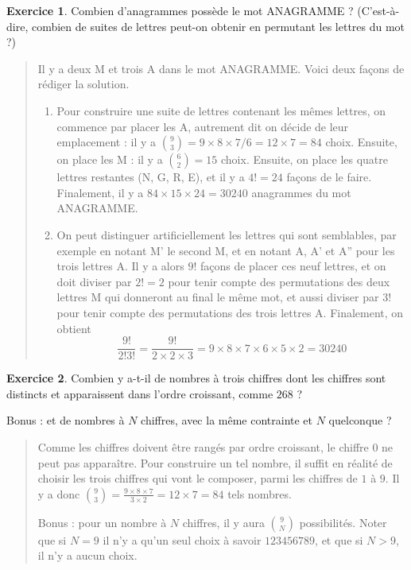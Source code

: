 \documentclass[11pt]{article}
\theoremstyle{definition}
\newtheorem{exo}{Exercice}
\newenvironment{solution}{\begin{quote}\color{teal}}{\end{quote}}
\begin{document}
\begin{exo}
Combien d'anagrammes possède le mot ANAGRAMME ? (C'est-à-dire, combien de suites de lettres  peut-on obtenir en permutant les lettres du mot ?)

\begin{solution}
Il y a deux M et trois A dans le mot ANAGRAMME.  Voici deux façons de rédiger la solution.
\begin{enumerate}
\item Pour construire une suite de lettres contenant les mêmes lettres, on commence par placer les A, autrement dit on décide de leur emplacement : il y a $\binom{9}{3}=9\times 8\times 7 /6 = 12\times 7=84$ choix. Ensuite, on place les M : il y a $\binom{6}{2}=15$ choix. 
Ensuite, on place les quatre lettres restantes (N, G, R, E), et il y a $4!=24$ façons de le faire.
Finalement, il y a $84\times 15\times 24=30240$ anagrammes du mot ANAGRAMME.
\item On peut distinguer artificiellement les lettres qui sont semblables, par exemple en notant M' le second M, et en notant A, A' et A'' pour les trois lettres A. Il y a alors $9!$ façons de placer ces neuf lettres, et on doit diviser par $2!=2$ pour tenir compte des permutations des deux lettres M qui donneront au final le même mot, et aussi diviser par $3!$ pour tenir compte des permutations des trois lettres A. Finalement, on obtient
\[ \frac{9!}{2!3!} = \frac{9!}{2\times 2\times 3} = 9\times 8\times 7\times 6\times 5\times 2 = 30240\]
\end{enumerate}

\end{solution}
\end{exo}


\begin{exo}
Combien y a-t-il de nombres à trois chiffres dont les chiffres sont distincts et apparaissent dans l'ordre croissant, comme $268$ ? 

Bonus : et de nombres à $N$ chiffres, avec la même contrainte et $N$ quelconque ?

\begin{solution}
Comme les chiffres doivent être rangés par ordre croissant, le chiffre $0$ ne peut pas apparaître. 
Pour construire un tel nombre, il suffit  en réalité de choisir les trois chiffres qui vont le composer, parmi les chiffres de $1$ à $9$. Il y a donc $\binom{9}{3}=\frac{9\times 8\times 7}{3\times 2}=12\times 7=84$ tels nombres.

Bonus : pour un nombre à $N$ chiffres, il y aura $\binom{9}{N}$ possibilités. Noter que si $N=9$ il n'y a qu'un seul choix à savoir $123456789$, et que si $N>9$, il n'y a aucun choix.
\end{solution}
\end{exo}
\end{document}

